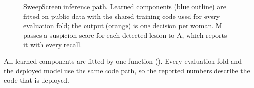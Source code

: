 \begin{figure}[t]
\caption{SweepScreen inference path. Learned components (blue outline) are fitted on public data with the shared training code used for every evaluation fold; the output (orange) is one decision per woman. M passes a suspicion score for each detected lesion to A, which reports it with every recall.}
\label{fig:arch}
\end{figure}

All learned components are fitted by one function (). Every evaluation fold and the deployed model use the same code path, so the reported numbers describe the code that is deployed.
